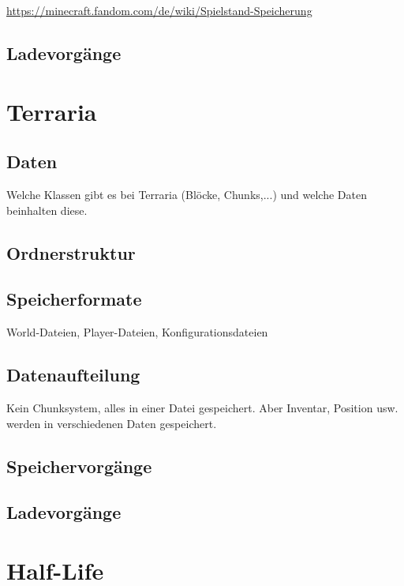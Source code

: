 \url{https://minecraft.fandom.com/de/wiki/Spielstand-Speicherung}

\subsection{Ladevorgänge}



\section{Terraria}
\subsection{Daten}
Welche Klassen gibt es bei Terraria (Blöcke, Chunks,...) und welche Daten 
beinhalten diese.

\subsection{Ordnerstruktur}

\subsection{Speicherformate}
World-Dateien, Player-Dateien, Konfigurationsdateien 

\subsection{Datenaufteilung}
Kein Chunksystem, alles in einer Datei gespeichert. Aber Inventar, Position
usw. werden in verschiedenen Daten gespeichert.

\subsection{Speichervorgänge}

\subsection{Ladevorgänge}



\section{Half-Life}
